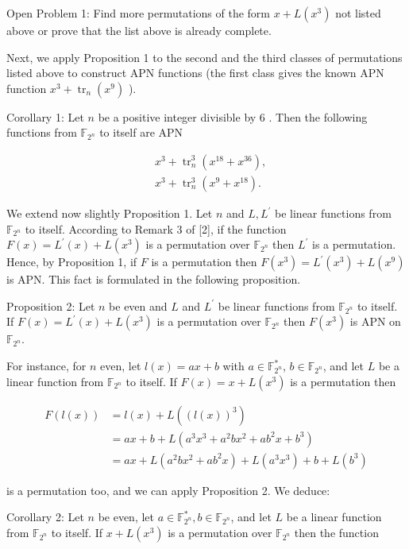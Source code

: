\documentclass[10pt]{article}
\begin{document}
Open Problem 1: Find more permutations of the form $x+ L\left(x^{3}\right)$ not listed above or prove that the list above is already complete.

Next, we apply Proposition 1 to the second and the third classes of permutations listed above to construct APN functions (the first class gives the known APN function $x^{3}+\operatorname{tr}_{n}\left(x^{9}\right)$ ).

Corollary 1: Let $n$ be a positive integer divisible by 6 . Then the following functions from $\mathbb{F}_{2^{n}}$ to itself are APN


\begin{align*}
& x^{3}+\operatorname{tr}_{n}^{3}\left(x^{18}+x^{36}\right),  \tag{4}\\
& x^{3}+\operatorname{tr}_{n}^{3}\left(x^{9}+x^{18}\right) . \tag{5}
\end{align*}


We extend now slightly Proposition 1. Let $n$ and $L, L^{\prime}$ be linear functions from $\mathbb{F}_{2^{n}}$ to itself. According to Remark 3 of [2], if the function $F(x)=L^{\prime}(x)+L\left(x^{3}\right)$ is a permutation over $\mathbb{F}_{2^{n}}$ then $L^{\prime}$ is a permutation. Hence, by Proposition 1, if $F$ is a permutation then $F\left(x^{3}\right)=L^{\prime}\left(x^{3}\right)+L\left(x^{9}\right)$ is APN. This fact is formulated in the following proposition.

Proposition 2: Let $n$ be even and $L$ and $L^{\prime}$ be linear functions from $\mathbb{F}_{2^{n}}$ to itself. If $F(x)=L^{\prime}(x)+L\left(x^{3}\right)$ is a permutation over $\mathbb{F}_{2^{n}}$ then $F\left(x^{3}\right)$ is APN on $\mathbb{F}_{2^{n}}$.

For instance, for $n$ even, let $l(x)=a x+b$ with $a \in \mathbb{F}_{2^{n}}^{*}$, $b \in \mathbb{F}_{2^{n}}$, and let $L$ be a linear function from $\mathbb{F}_{2^{n}}$ to itself. If $F(x)=x+L\left(x^{3}\right)$ is a permutation then

$$
\begin{aligned}
F(l(x)) & =l(x)+L\left((l(x))^{3}\right) \\
& =a x+b+L\left(a^{3} x^{3}+a^{2} b x^{2}+a b^{2} x+b^{3}\right) \\
& =a x+L\left(a^{2} b x^{2}+a b^{2} x\right)+L\left(a^{3} x^{3}\right)+b+L\left(b^{3}\right)
\end{aligned}
$$

is a permutation too, and we can apply Proposition 2. We deduce:

Corollary 2: Let $n$ be even, let $a \in \mathbb{F}_{2^{n}}^{*}, b \in \mathbb{F}_{2^{n}}$, and let $L$ be a linear function from $\mathbb{F}_{2^{n}}$ to itself. If $x+L\left(x^{3}\right)$ is a permutation over $\mathbb{F}_{2^{n}}$ then the function
\end{document}

